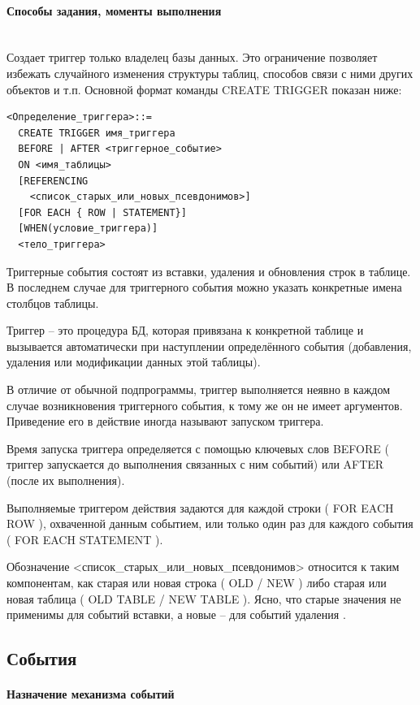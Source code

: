 \paragraph{Способы задания, моменты выполнения} ~\\

Создает триггер только владелец базы данных. Это ограничение позволяет избежать случайного изменения структуры таблиц, способов связи с ними других объектов и т.п.
Основной формат команды CREATE TRIGGER показан ниже:
\begin{verbatim}
<Определение_триггера>::=
  CREATE TRIGGER имя_триггера
  BEFORE | AFTER <триггерное_событие>
  ON <имя_таблицы>
  [REFERENCING
    <список_старых_или_новых_псевдонимов>]
  [FOR EACH { ROW | STATEMENT}]
  [WHEN(условие_триггера)]
  <тело_триггера>
\end{verbatim}

Триггерные события состоят из вставки, удаления и обновления строк в таблице. В последнем случае для триггерного события можно указать конкретные имена столбцов таблицы.

Триггер – это процедура БД, которая привязана к конкретной таблице и вызывается
автоматически при наступлении определённого события
(добавления, удаления или модификации данных этой таблицы).

В отличие от обычной подпрограммы, триггер выполняется неявно в каждом случае возникновения триггерного события, к тому же он не имеет аргументов. Приведение его в действие иногда называют запуском триггера.

Время запуска триггера определяется с помощью ключевых слов BEFORE ( триггер запускается до выполнения связанных с ним событий) или AFTER (после их выполнения).

Выполняемые триггером действия задаются для каждой строки ( FOR EACH ROW ), охваченной данным событием, или только один раз для каждого события ( FOR EACH STATEMENT ).

Обозначение <список\_старых\_или\_новых\_псевдонимов> относится к таким компонентам, как старая или новая строка ( OLD / NEW ) либо старая или новая таблица ( OLD TABLE / NEW TABLE ). Ясно, что старые значения не применимы для событий вставки, а новые – для событий удаления \autocite{IntuitTrigg}.

\subsection{События}

\paragraph{Назначение механизма событий} ~\\

